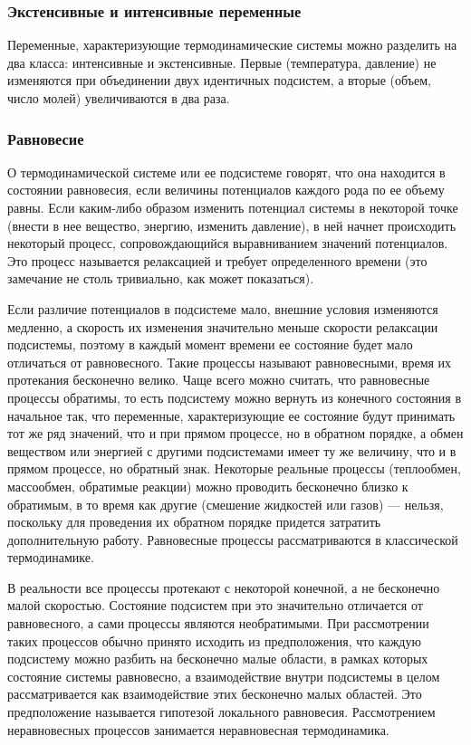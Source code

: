 \documentclass{article}
\begin{document}
	\subsubsection{Экстенсивные и интенсивные переменные}
	
	Переменные, характеризующие термодинамические системы можно разделить на два класса: интенсивные и экстенсивные. Первые (температура, давление) не изменяются при объединении двух идентичных подсистем, а вторые (объем, число молей) увеличиваются в два раза.
	
	\subsubsection{Равновесие}
	
	О термодинамической системе или ее подсистеме говорят, что она находится в состоянии равновесия, если величины потенциалов каждого рода по ее объему равны. Если каким-либо образом изменить потенциал системы в некоторой точке (внести в нее вещество, энергию, изменить давление), в ней начнет происходить некоторый процесс, сопровождающийся выравниванием значений потенциалов. Это процесс называется релаксацией и требует определенного времени (это замечание не столь тривиально, как может показаться).
	
	Если различие потенциалов в подсистеме мало, внешние условия изменяются медленно, а скорость их изменения значительно меньше скорости релаксации подсистемы, поэтому в каждый момент времени ее состояние будет мало отличаться от равновесного. Такие процессы называют равновесными, время их протекания бесконечно велико. Чаще всего можно считать, что равновесные процессы обратимы, то есть подсистему можно вернуть из конечного состояния в начальное так, что переменные, характеризующие ее состояние будут принимать тот же ряд значений, что и при прямом процессе, но в обратном порядке, а обмен веществом или энергией с другими подсистемами имеет ту же величину, что и в прямом процессе, но обратный знак. Некоторые реальные процессы (теплообмен, массообмен, обратимые реакции) можно проводить бесконечно близко к обратимым, в то время как другие (смешение жидкостей или газов) --- нельзя, поскольку для проведения их обратном порядке придется затратить дополнительную работу. Равновесные процессы рассматриваются в классической термодинамике.
	
	В реальности все процессы протекают с некоторой конечной, а не бесконечно малой скоростью. Состояние подсистем при это значительно отличается от равновесного, а сами процессы являются необратимыми. При рассмотрении таких процессов обычно принято исходить из предположения, что каждую подсистему можно разбить на бесконечно малые области, в рамках которых состояние системы равновесно, а взаимодействие внутри подсистемы в целом рассматривается как взаимодействие этих бесконечно малых областей. Это предположение называется гипотезой локального равновесия. Рассмотрением неравновесных процессов занимается неравновесная термодинамика.
	
\end{document}
